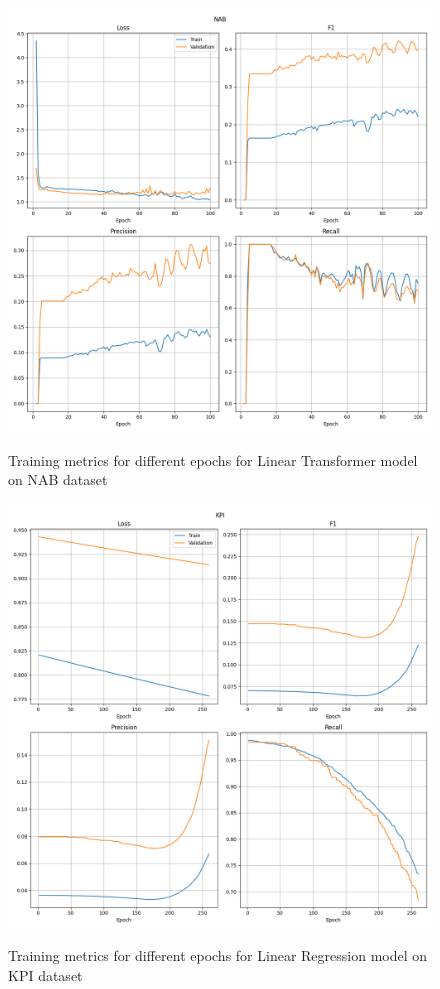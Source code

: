 \documentclass[a4paper, twoside]{report}
\theoremstyle{definition}
\numberwithin{equation}{section}
\begin{document}
\begin{figure}[h!]
    \centering
    \caption{Training metrics for different epochs for Linear Transformer model on NAB dataset}
    \includegraphics[width=\textwidth]{plots/LinearTransformer_NAB.png}
    \label{fig:LinearTransformer_NAB_training}
\end{figure}

\begin{figure}[h!]
    \centering
    \caption{Training metrics for different epochs for Linear Regression model on KPI dataset}
    \includegraphics[width=\textwidth]{plots/LinearRegression_KPI.png}
    \label{fig:LinearRegression_KPI_training}
\end{figure}
\end{document}
